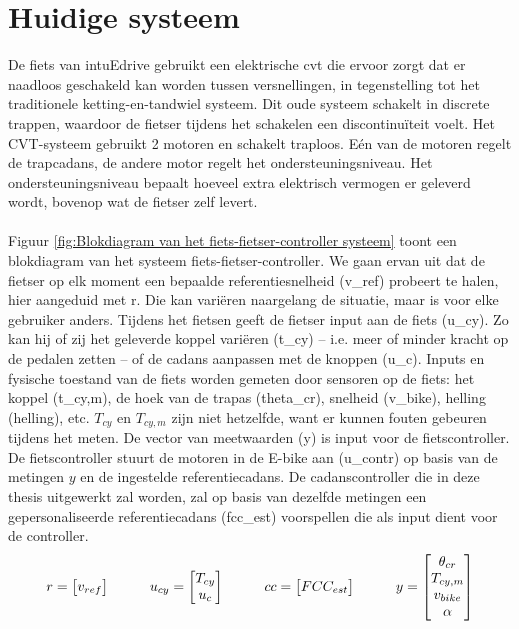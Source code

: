 \section{Huidige systeem}
De fiets van intuEdrive gebruikt een elektrische \gls{cvt} die ervoor zorgt dat er naadloos geschakeld kan worden tussen versnellingen, in tegenstelling tot het traditionele ketting-en-tandwiel systeem. Dit oude systeem schakelt in discrete trappen, waardoor de fietser tijdens het schakelen een discontinuïteit voelt. Het CVT-systeem gebruikt 2 motoren en schakelt traploos. Eén van de motoren regelt de trapcadans, de andere motor regelt het ondersteuningsniveau. Het ondersteuningsniveau bepaalt hoeveel extra elektrisch vermogen er geleverd wordt, bovenop wat de fietser zelf levert.
\\\\
Figuur \ref{fig:Blokdiagram van het fiets-fietser-controller systeem} toont een blokdiagram van het systeem fiets-fietser-controller. We gaan ervan uit dat de fietser op elk moment een bepaalde referentiesnelheid (\gls{v_ref}) probeert te halen, hier aangeduid met \gls{r}. Die kan variëren naargelang de situatie, maar is voor elke gebruiker anders. Tijdens het fietsen geeft de fietser input aan de fiets (\gls{u_cy}). Zo kan hij of zij het geleverde koppel variëren (\gls{t_cy}) – i.e. meer of minder kracht op de pedalen zetten – of de cadans aanpassen met de knoppen (\gls{u_c}). Inputs en fysische toestand van de fiets worden gemeten door sensoren op de fiets: het koppel (\gls{t_cy,m}), de hoek van de trapas (\gls{theta_cr}), snelheid (\gls{v_bike}), helling (\gls{helling}), etc. $T_{cy}$ en $T_{cy,m}$ zijn niet hetzelfde, want er kunnen fouten gebeuren tijdens het meten. De vector van meetwaarden (\gls{y}) is input voor de fietscontroller. De fietscontroller stuurt de motoren in de E-bike aan (\gls{u_contr}) op basis van de metingen $y$ en de ingestelde referentiecadans. De cadanscontroller die in deze thesis uitgewerkt zal worden, zal op basis van dezelfde metingen een gepersonaliseerde referentiecadans (\gls{fcc_est}) voorspellen die als input dient voor de controller.
\begin{gather*}
r = \begin{bmatrix}
       v_{ref}  
     \end{bmatrix} \hspace*{1cm}
u_{cy} = \begin{bmatrix}
       T_{cy} \\ u_c  
     \end{bmatrix} \hspace*{1cm}
cc = \begin{bmatrix}
       FCC_{est}  
     \end{bmatrix} \hspace*{1cm}
y = \begin{bmatrix} 
       \theta _{cr} \\ T_{cy,m} \\ v_{bike} \\ \alpha
     \end{bmatrix} 
\end{gather*}
